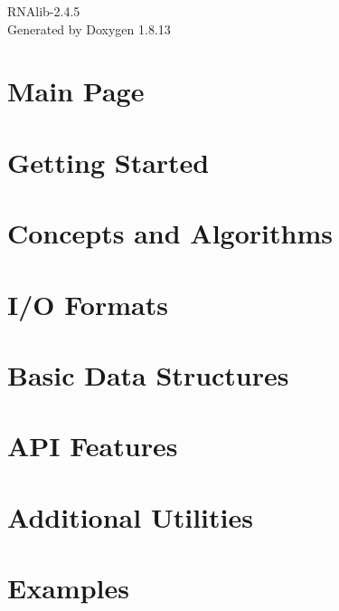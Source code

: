 \documentclass[twoside]{book}
\newcommand{\+}{\discretionary{\mbox{\scriptsize$\hookleftarrow$}}{}{}}
\newcommand{\clearemptydoublepage}{%
  \newpage{\pagestyle{empty}\cleardoublepage}%
}
\begin{document}
\hypersetup{pageanchor=false,
             bookmarksnumbered=true,
             pdfencoding=unicode
            }
\begin{titlepage}
\vspace*{7cm}
\begin{center}%
{\Large R\+N\+Alib-\/2.4.5 }\\
\vspace*{1cm}
{\large Generated by Doxygen 1.8.13}\\
\end{center}
\end{titlepage}
\clearemptydoublepage
{}
\tableofcontents
\clearemptydoublepage
{}
\hypersetup{pageanchor=true}

\chapter{Main Page}
\label{index}\hypertarget{index}{}
\chapter{Getting Started}
\label{getting_started}

\chapter{Concepts and Algorithms}
\label{concepts}

\chapter{I/O Formats}
\label{io}

\chapter{Basic Data Structures}
\label{data_structures}

\chapter{A\+PI Features}
\label{api_features}

\chapter{Additional Utilities}
\label{utilities}

\chapter{Examples}
\label{examples}

\end{document}
